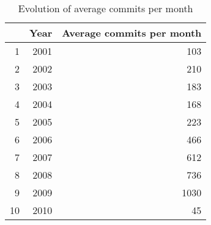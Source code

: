 \begin{table}[ht]
\begin{center}
\begin{tabular}{rrr}
  \hline
 & Year & Average commits per month \\ 
  \hline
1 & 2001 & 103 \\ 
  2 & 2002 & 210 \\ 
  3 & 2003 & 183 \\ 
  4 & 2004 & 168 \\ 
  5 & 2005 & 223 \\ 
  6 & 2006 & 466 \\ 
  7 & 2007 & 612 \\ 
  8 & 2008 & 736 \\ 
  9 & 2009 & 1030 \\ 
  10 & 2010 &  45 \\ 
   \hline
\end{tabular}
\caption{Evolution of average commits per month}
\end{center}
\end{table}
